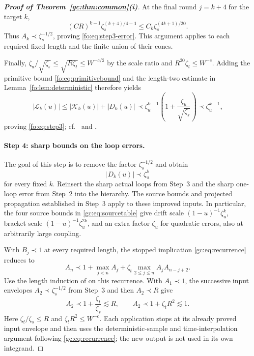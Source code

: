 \documentclass[11pt]{article}
\numberwithin{equation}{section}
\theoremstyle{remark}
\newcommand{\cL}{\mathcal L}
\newcommand{\cK}{\mathcal K}
\begin{document}
\begin{proof}[\textbf{Proof of Theorem~\ref{gc:thm:common}(i)}]
At the final round $j=k+4$ for the target $k$,
\[
 (CR)^{k-1}\zeta_s^{(k+4)/4-1}
 \le C_k\zeta_s^{(4k+1)/20}.
\]
Thus $A_k\prec\zeta_s^{-1/2}$, proving
\eqref{fo:eq:step3-error}. This argument applies to each required fixed
length and the finite union of their cones.

Finally, $\zeta_u/\sqrt{\zeta_s}\le\sqrt{R\zeta_t}\le W^{-c/2}$
by the scale ratio and $R^{20}\zeta_t\le W^{-c}$.
Adding the primitive bound \eqref{fo:eq:primitivebound} and the
length-two estimate in Lemma~\ref{fo:lem:deterministic} therefore yields
\[
 |\cL_k(u)|\le|\cK_k(u)|+|D_k(u)|
 \prec\zeta_u^{k-1}\left(1+\frac{\zeta_u}{\sqrt{\zeta_s}}\right)
 \prec\zeta_u^{k-1},
\]
proving \eqref{fo:eq:step3}; cf.\
\cite[Section~7.4, (5.15)]{TYY} and \cite[Section~5.6, (2.77)]{YY}.

\paragraph{Step 4: sharp bounds on the loop errors.}
The goal of this step is to remove the factor $\zeta_s^{-1/2}$ and obtain
\begin{equation}\label{fo:eq:step4}
 |D_k(u)|\prec\zeta_u^k
\end{equation}
for every fixed $k$. Reinsert the sharp actual loops from Step~3
and the sharp one-loop error from Step~2 into the hierarchy.
The source bounds and projected propagation established in
Step~3 apply to these improved inputs. In particular, the four source
bounds in \eqref{gc:eq:sourcetable} give drift scale $(1-u)^{-1}\zeta_u^k$,
bracket scale $(1-u)^{-1}\zeta_u^{2k}$, and an extra factor
$\zeta_u$ for quadratic errors, also at arbitrarily large coupling.

With $B_j\prec1$ at every required length, the stopped implication
\eqref{gc:eq:recurrence} reduces to
\[
 A_n\prec1+\max_{j<n}A_j
       +\zeta_t\max_{2\le j\le n}A_jA_{n-j+2}.
\]
Use the length induction of \cite[Section~7.5, (7.66)--(7.67)]{TYY}
on this recurrence. With $A_1\prec1$, the successive input envelopes
$A_2\prec\zeta_s^{-1/2}$ from Step~3 and then $A_2\prec R$ give
\begin{equation}\label{fo:eq:two-loop-sharpening}
 A_2\prec1+\frac{\zeta_t}{\zeta_s}\lesssim R,\qquad
 A_2\prec1+\zeta_t R^2\lesssim1.
\end{equation}
Here $\zeta_t/\zeta_s\le R$ and $\zeta_tR^2\le W^{-c}$.
Each application stops at its already proved input envelope and then
uses the deterministic-sample and time-interpolation argument following
\eqref{gc:eq:recurrence}; the new output is not used in its own integrand.


\end{proof}
\end{document}

